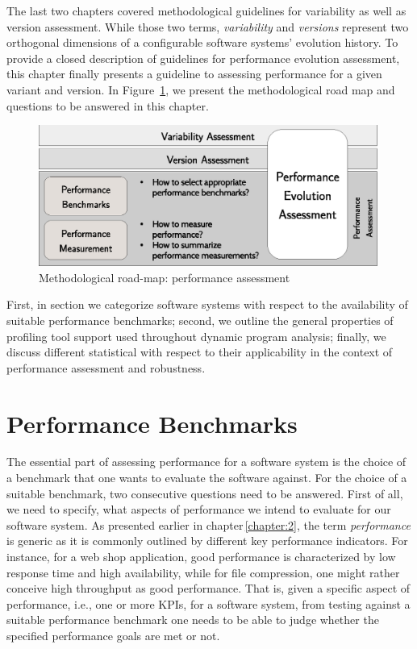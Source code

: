 The last two chapters covered methodological guidelines for variability as well
as version assessment. While those two terms, \emph{variability} and
\emph{versions} represent two orthogonal dimensions of a configurable software
systems’ evolution history. To provide a closed description of guidelines for performance
evolution assessment, this chapter finally presents a guideline to assessing
performance for a given variant and version. In Figure~\ref{fig:roadmap_3}, we
present the methodological road map and questions to be answered in this chapter.

\begin{figure}[h!]
	\centering
	\includegraphics[width=0.99\textwidth]{images/process_perfassessment.eps}
	\caption{Methodological road-map: performance assessment}
	\label{fig:roadmap_3}
\end{figure}

First, in section we categorize software systems with respect to the availability of suitable performance
benchmarks; second, we outline the general properties of profiling tool support
used throughout dynamic program analysis; finally, we discuss different statistical
with respect to their applicability in the context of performance assessment
and robustness.

\section{Performance Benchmarks}
The essential part of assessing performance for a software system is the choice
of a benchmark that one wants to evaluate the software against. For the choice
of a suitable benchmark, two consecutive questions need to be answered. First of
all, we need to specify, what aspects of performance we intend to evaluate for
our software system. As presented earlier in chapter\,\ref{chapter:2}, the term
\emph{performance} is generic as it is commonly outlined by different key
performance indicators. For instance, for a web shop application, good performance is characterized by low response
time and high availability, while for file compression, one might rather
conceive high throughput as good performance. That is, given a specific
aspect of performance, i.e., one or more KPIs, for a software system, from
testing against a suitable performance benchmark one needs to be able to judge
whether the specified performance goals are met or not.

